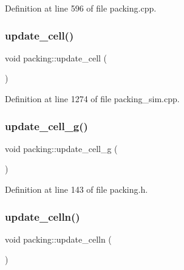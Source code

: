 Definition at line 596 of file packing.\+cpp.

\mbox{\label{classpacking_a944bd29a56c2811a991174ddb18aba63}} 
\subsubsection{\texorpdfstring{update\+\_\+cell()}{update\_cell()}}
{\footnotesize\ttfamily void packing\+::update\+\_\+cell (\begin{DoxyParamCaption}{ }\end{DoxyParamCaption})}



Definition at line 1274 of file packing\+\_\+sim.\+cpp.

\mbox{\label{classpacking_a7d0e7e1a244a3cb1080a5b8c189a3373}} 
\subsubsection{\texorpdfstring{update\+\_\+cell\+\_\+g()}{update\_cell\_g()}}
{\footnotesize\ttfamily void packing\+::update\+\_\+cell\+\_\+g (\begin{DoxyParamCaption}{ }\end{DoxyParamCaption})\hspace{0.3cm}{\ttfamily [inline]}}



Definition at line 143 of file packing.\+h.

\mbox{\label{classpacking_ac55b5f684a8767d536c671f23eea808e}} 
\subsubsection{\texorpdfstring{update\+\_\+celln()}{update\_celln()}}
{\footnotesize\ttfamily void packing\+::update\+\_\+celln (\begin{DoxyParamCaption}{ }\end{DoxyParamCaption})}



